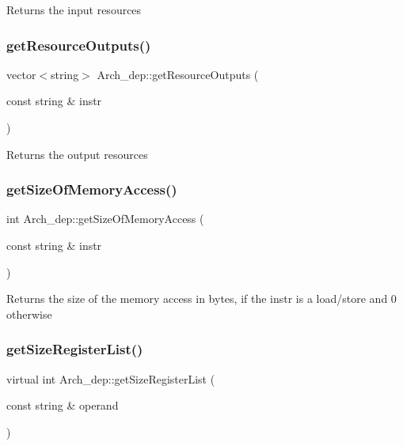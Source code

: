 Returns the input resources \mbox{\label{classArch__dep_a09460de38072b0a85ac88f64f0ed42c2}} 
\subsubsection{\texorpdfstring{get\+Resource\+Outputs()}{getResourceOutputs()}}
{\footnotesize\ttfamily vector$<$string$>$ Arch\+\_\+dep\+::get\+Resource\+Outputs (\begin{DoxyParamCaption}\item[{const string \&}]{instr }\end{DoxyParamCaption})}

Returns the output resources \mbox{\label{classArch__dep_ac0af59ba86c85f71a733f9e56debc411}} 
\subsubsection{\texorpdfstring{get\+Size\+Of\+Memory\+Access()}{getSizeOfMemoryAccess()}}
{\footnotesize\ttfamily int Arch\+\_\+dep\+::get\+Size\+Of\+Memory\+Access (\begin{DoxyParamCaption}\item[{const string \&}]{instr }\end{DoxyParamCaption})}

Returns the size of the memory access in bytes, if the instr is a load/store and 0 otherwise \mbox{\label{classArch__dep_aff5899fb3e5793bf07f43512bfcc04e1}} 
\subsubsection{\texorpdfstring{get\+Size\+Register\+List()}{getSizeRegisterList()}}
{\footnotesize\ttfamily virtual int Arch\+\_\+dep\+::get\+Size\+Register\+List (\begin{DoxyParamCaption}\item[{const string \&}]{operand }\end{DoxyParamCaption})\hspace{0.3cm}{\ttfamily [pure virtual]}}

